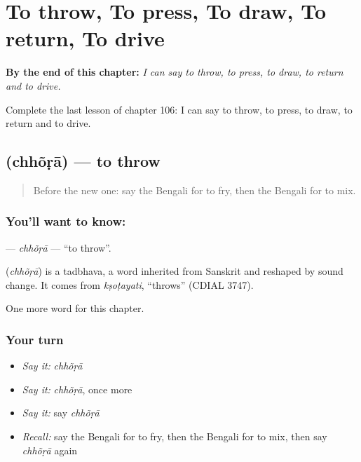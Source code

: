 
\chapter{To throw, To press, To draw, To return, To drive}
\label{ch:bn-to-throw-to-press-to-draw-to-return-to-drive}

\begin{chapteropening}
\textbf{By the end of this chapter:} \emph{I can say to throw, to press, to draw, to return and to drive.}

Complete the last lesson of chapter 106: I can say to throw, to press, to draw, to return and to drive.
\end{chapteropening}

\section[\texorpdfstring{\bn{ছোড়া} (chhõṛā)}{ছোড়া (chhõṛā)}]{ (chhõṛā) — to throw}

\label{lesson:BN-C106-chhora}



\begin{quote}
Before the new one: say the Bengali for to fry, then the Bengali for to mix.
\end{quote}

\subsection*{You'll want to know: }
\textbf{} — \emph{chhõṛā} — \textquotedblleft{}to throw\textquotedblright{}.

\begin{cousinweb}
\textbf{} (\emph{chhõṛā}) is a tadbhava, a word inherited from Sanskrit and reshaped by sound change. It comes from \emph{kṣoṭayati}, \textquotedblleft{}throws\textquotedblright{} (CDIAL 3747).
\end{cousinweb}

\begin{grammarlens}[title={What you've built}]
One more word for this chapter.
\end{grammarlens}

\subsection*{Your turn}
\begin{itemize}
\raggedright
  \item \emph{Say it:} \emph{chhõṛā}
  \item \emph{Say it:} \emph{chhõṛā}, once more
  \item \emph{Say it:} say \emph{chhõṛā}
  \item \emph{Recall:} say the Bengali for to fry, then the Bengali for to mix, then say \emph{chhõṛā} again
\end{itemize}

